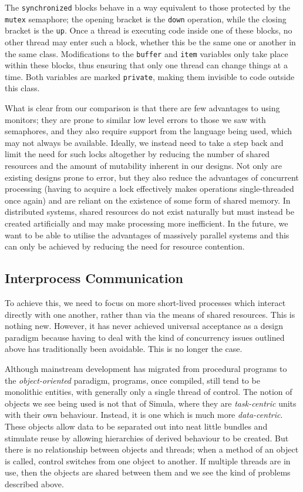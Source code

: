 The \texttt{synchronized} blocks behave in a way equivalent to those
protected by the \texttt{mutex} semaphore; the opening bracket is the
\texttt{down} operation, while the closing bracket is the \texttt{up}.
Once a thread is executing code inside one of these blocks, no other
thread may enter such a block, whether this be the same one or another
in the same class.  Modifications to the \texttt{buffer} and
\texttt{item} variables only take place within these blocks, thus
ensuring that only one thread can change things at a time.  Both
variables are marked \texttt{private}, making them invisible to code
outside this class.

What is clear from our comparison is that there are few advantages to
using monitors; they are prone to similar low level errors to those we
saw with semaphores, and they also require support from the language
being used, which may not always be available.  Ideally, we instead
need to take a step back and limit the need for such locks altogether
by reducing the number of shared resources and the amount of
mutability inherent in our designs.  Not only are existing designs
prone to error, but they also reduce the advantages of concurrent
processing (having to acquire a lock effectively makes operations
single-threaded once again) and are reliant on the existence of some
form of shared memory.  In distributed systems, shared resources do
not exist naturally but must instead be created artificially and may
make processing more inefficient.  In the future, we want to be able
to utilise the advantages of massively parallel systems and this can
only be achieved by reducing the need for resource contention.

\subsection{Interprocess Communication}
\label{ipc}

To achieve this, we need to focus on more short-lived processes which
interact directly with one another, rather than via the means of
shared resources.  This is nothing new.  However, it has never
achieved universal acceptance as a design paradigm because having to
deal with the kind of concurrency issues outlined above has
traditionally been avoidable.  This is no longer the case.

Although mainstream development has migrated from procedural programs
to the \emph{object-oriented} paradigm, programs, once compiled, still
tend to be monolithic entities, with generally only a single thread of
control.  The notion of objects we see being used is not that of
Simula\cite{simula}, where they are \emph{task-centric} units with
their own behaviour.  Instead, it is one which is much more
\emph{data-centric}.  These objects allow data to be separated out
into neat little bundles and stimulate reuse by allowing hierarchies
of derived behaviour to be created.  But there is no relationship
between objects and threads; when a method of an object is called,
control switches from one object to another.  If multiple threads are
in use, then the objects are shared between them and we see the kind
of problems described above.

